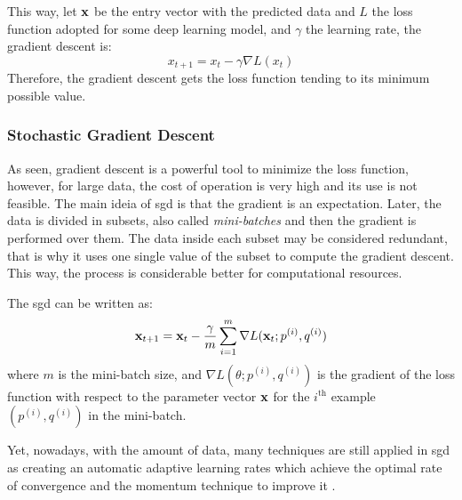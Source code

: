 This way, let \(\vb{x}\) be the entry vector with the predicted data and \(L\) the loss function adopted for some deep learning model, and \(\gamma\) the learning rate, the gradient descent is:
%
\begin{equation}
    x_{t+1} = x_t - \gamma\nabla L(x_t)
\end{equation}
%
Therefore, the gradient descent gets the loss function tending to its minimum possible value.

\subsubsection*{Stochastic Gradient Descent}

As seen, gradient descent is a powerful tool to minimize the loss function, however, for large data, the cost of operation is very high and its use is not feasible. 
The main ideia of \gls*{sgd} is that the gradient is an expectation.
Later, the data is divided in subsets, also called \emph{mini-batches} and then the gradient is performed over them.
The data inside each subset may be considered redundant, that is why it uses one single value of the subset to compute the gradient descent.
This way, the process is considerable better for computational resources.

The \gls*{sgd} can be written as:
%
\begin{equation}
    \vb{x}_{t+1} = \vb{x}_t - \frac{\gamma}{m} \sum_{i=1}^m \nabla L(\vb{x}_t; p^{(i)},q^{(i)})
\end{equation}
%
where \(m\) is the mini-batch size, and \(\nabla L(\theta; p^{(i)}, q^{(i)})\) is the gradient of the loss function with respect to the parameter vector \(\vb{x}\) for the \(i^{\text{th}}\) example \((p^{(i)}, q^{(i)})\) in the mini-batch.

Yet, nowadays, with the amount of data, many techniques are still applied in \gls*{sgd} as creating an automatic adaptive learning rates which achieve the optimal rate of convergence \citep{darken1991} and the momentum technique to improve it \citep{sutskever2013}.



